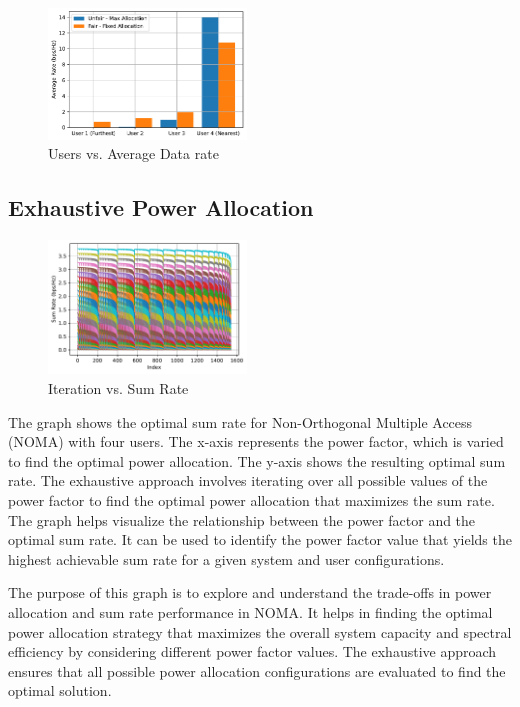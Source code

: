 \documentclass[conference]{IEEEtran}
\begin{document}
\begin{figure}[t!]
    \centering
    \includegraphics[width=0.47\textwidth , height= 0.35\textwidth]{figures/fairness_comparison.pdf}
    \caption{Users vs. Average Data rate}
\end{figure}

\subsection{Exhaustive Power Allocation}

\begin{figure}[b!]
    \centering
    \includegraphics[width=0.47\textwidth]{figures/sumrate_vs_index.pdf}
    \caption{Iteration vs. Sum Rate}
\end{figure}

The graph shows the optimal sum rate for Non-Orthogonal Multiple Access (NOMA) with four users. The x-axis represents the power factor, which is varied to find the optimal power allocation. The y-axis shows the resulting optimal sum rate. The exhaustive approach involves iterating over all possible values of the power factor to find the optimal power allocation that maximizes the sum rate. The graph helps visualize the relationship between the power factor and the optimal sum rate. It can be used to identify the power factor value that yields the highest achievable sum rate for a given system and user configurations.

The purpose of this graph is to explore and understand the trade-offs in power allocation and sum rate performance in NOMA. It helps in finding the optimal power allocation strategy that maximizes the overall system capacity and spectral efficiency by considering different power factor values. The exhaustive approach ensures that all possible power allocation configurations are evaluated to find the optimal solution.
\end{document}
